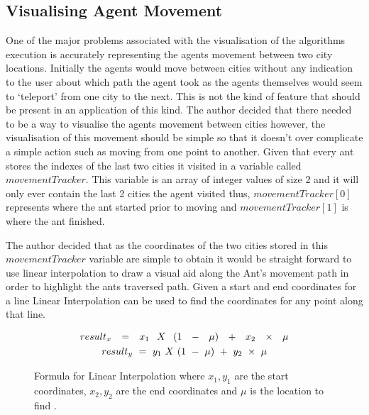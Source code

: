\subsection{Visualising Agent Movement}
\label{visy}
One of the major problems associated with the visualisation of the algorithms execution is accurately representing the agents movement between two city locations. Initially the agents would move between cities without any indication to the user about which path the agent took as the agents themselves would seem to `teleport' from one city to the next. This is not the kind of feature that should be present in an application of this kind. The author decided that there needed to be a way to visualise the agents movement between cities however, the visualisation of this movement should be simple so that it doesn’t over complicate a simple action such as moving from one point to another. Given that every ant stores the indexes of the last two cities it visited in a variable called $movementTracker$. This variable is an array of integer values of size 2 and it will only ever contain the last 2 cities the agent visited thus, $movementTracker[0]$ represents where the ant started prior to moving and $movementTracker[1]$ is where the ant finished.

The author decided that as the coordinates of the two cities stored in this $movementTracker$ variable are simple to obtain it would be straight forward to use linear interpolation to draw a visual aid along the Ant's movement path in order to highlight the ants traversed path. Given a start and end coordinates for a line Linear Interpolation can be used to find the coordinates for any point along that line. 

\begin{figure}[H]
\centering
\begin{gather*}
\Huge
result_x\ =\ x_1\ X\ (1\ -\ \mu)\ +\ x_2\ \times\ \mu \\
result_y\ =\ y_1\ X\ (1\ -\ \mu)\ +\ y_2\ \times\ \mu
\end{gather*}
\caption[Linear Interpolation Formula]{Formula for Linear Interpolation where $x_1,y_1$ are the start coordinates, $x_2, y_2$ are the end coordinates and $\mu$ is the location to find \cite{interpolation:site}.}
\label{fig:interPolateEqn}
\end{figure}

